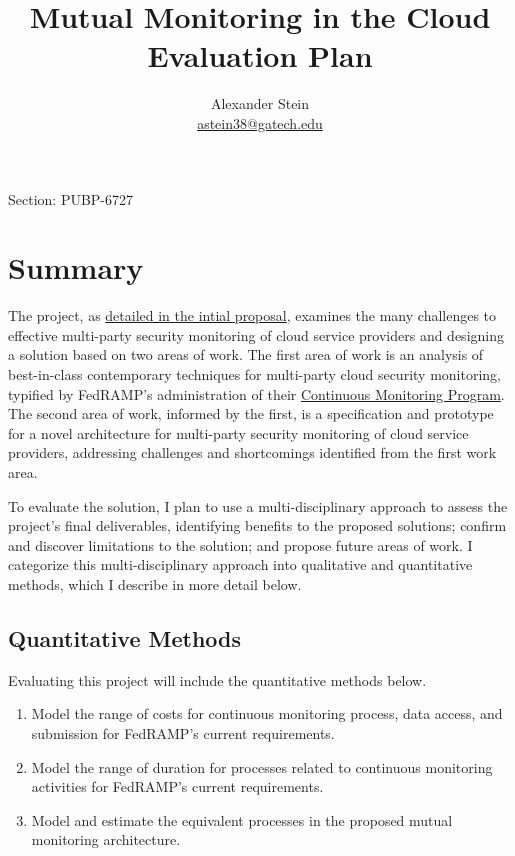 \documentclass{jdf}
\begin{document}
Section: PUBP-6727
\title{Mutual Monitoring in the Cloud \\ Evaluation Plan}
\author{Alexander Stein \\ \hyperlink{mailto:astein38@gatech.edu}{astein38@gatech.edu}}

\maketitle
\thispagestyle{fancy}

\section*{Summary}

The project, as \hyperlink{https://github.com/aj-stein/practicum_proposal/blob/5238ba70dd8736320400ee6907b3fcfdd8ae672b/paper.pdf}{detailed in the intial proposal}, examines the many challenges to effective multi-party security monitoring of cloud service providers and designing a solution based on two areas of work. The first area of work is an analysis of best-in-class contemporary techniques for multi-party cloud security monitoring, typified by FedRAMP's administration of their \hyperlink{https://web.archive.org/web/20250616221039/https://www.fedramp.gov/assets/resources/documents/CSP_Continuous_Monitoring_Performance_Management_Guide.pdf}{Continuous Monitoring Program}. The second area of work, informed by the first, is a specification and prototype for a novel architecture for multi-party security monitoring of cloud service providers, addressing challenges and shortcomings identified from the first work area.

To evaluate the solution, I plan to use a multi-disciplinary approach to assess the project's final deliverables, identifying benefits to the proposed solutions; confirm and discover limitations to the solution; and propose future areas of work. I categorize this multi-disciplinary approach into qualitative and quantitative methods, which I describe in more detail below.

\subsection*{Quantitative Methods}

Evaluating this project will include the quantitative methods below.

\begin{enumerate}
  \item Model the range of costs for continuous monitoring process, data access, and submission for FedRAMP's current requirements.
  \item Model the range of duration for processes related to continuous monitoring activities for FedRAMP's current requirements.
  \item Model and estimate the equivalent processes in the proposed mutual monitoring architecture.
\end{enumerate}
\end{document}
